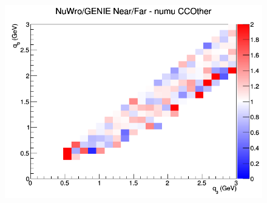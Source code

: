 \documentclass[12pt]{article}
\begin{document}
\begin{figure}[h]
\endminipage
{}
\includegraphics[width=\linewidth]{q0_q3/nominal/ratios/CCOther_NuWro_GENIE_numu_NF_q3_q0.png}
\endminipage
\newline
\end{figure}
\clearpage
\end{document}
